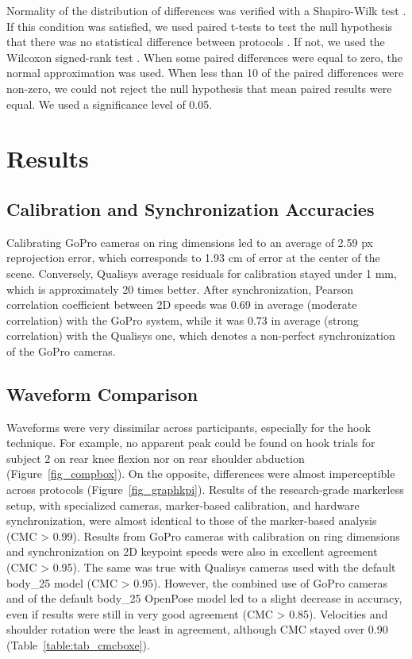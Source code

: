 Normality of the distribution of differences was verified with a Shapiro-Wilk test \cite{Shapiro1965}. If this condition was satisfied, we used paired t-tests to test the null hypothesis that there was no statistical difference between protocols \cite{Student1908}. If not, we used the Wilcoxon signed-rank test \cite{Wilcoxon1945}. When some paired differences were equal to zero, the normal approximation was used. When less than 10 of the paired differences were non-zero, we could not reject the null hypothesis that mean paired results were equal. We used a significance level of 0.05.


\section{Results}

\subsection{Calibration and Synchronization Accuracies}

Calibrating GoPro cameras on ring dimensions led to an average of 2.59 px reprojection error, which corresponds to 1.93 cm of error at the center of the scene. Conversely, Qualisys average residuals for calibration stayed under 1 mm, which is approximately 20 times better. After synchronization, Pearson correlation coefficient between 2D speeds was 0.69 in average (moderate correlation) with the GoPro system, while it was 0.73 in average (strong correlation) with the Qualisys one, which denotes a non-perfect synchronization of the GoPro cameras. 


\subsection{Waveform Comparison}

Waveforms were very dissimilar across participants, especially for the hook technique. For example, no apparent peak could be found on hook trials for subject 2 on rear knee flexion nor on rear shoulder abduction (Figure~\ref{fig_compbox}). On the opposite, differences were almost imperceptible across protocols (Figure~\ref{fig_graphkpi}). Results of the research-grade markerless setup, with specialized cameras, marker-based calibration, and hardware synchronization, were almost identical to those of the marker-based analysis (CMC > 0.99). Results from GoPro cameras with calibration on ring dimensions and synchronization on 2D keypoint speeds were also in excellent agreement \\(CMC > 0.95). The same was true with Qualisys cameras used with the default body\_25 model (CMC > 0.95). However, the combined use of GoPro cameras and of the default body\_25 OpenPose model led to a slight decrease in accuracy, even if results were still in very good agreement (CMC > 0.85). Velocities and shoulder rotation were the least in agreement, although CMC stayed over 0.90 (Table~\ref{table:tab_cmcboxe}).

